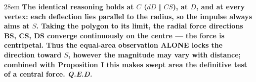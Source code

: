 \documentclass[border=4pt]{standalone}
\begin{document}
\begin{varwidth}{28em}
\large\bfseries
The identical reasoning holds at $C$ ($dD \parallel CS$), at $D$, and at every vertex: each deflection lies parallel to the radius, so the impulse always aims at $S$. Taking the polygon to its limit, the radial force directions BS, CS, DS converge continuously on the centre — the force is centripetal. Thus the equal-area observation ALONE locks the direction toward $S$, however the magnitude may vary with distance; combined with Proposition I this makes swept area the definitive test of a central force. \textit{Q.E.D.}
\end{varwidth}
\end{document}
